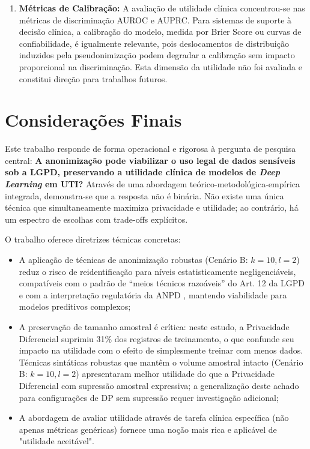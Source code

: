 \begin{enumerate}
    \item \textbf{Métricas de Calibração:} A avaliação de utilidade clínica concentrou-se nas métricas de discriminação AUROC e AUPRC. Para sistemas de suporte à decisão clínica, a calibração do modelo, medida por Brier Score ou curvas de confiabilidade, é igualmente relevante, pois deslocamentos de distribuição induzidos pela pseudonimização podem degradar a calibração sem impacto proporcional na discriminação. Esta dimensão da utilidade não foi avaliada e constitui direção para trabalhos futuros.
\end{enumerate}

\section{Considerações Finais}
\label{sec:conclusao-finais}

Este trabalho responde de forma operacional e rigorosa à pergunta de pesquisa central: \textbf{A anonimização pode viabilizar o uso legal de dados sensíveis sob a LGPD, preservando a utilidade clínica de modelos de \textit{Deep Learning} em UTI?} Através de uma abordagem teórico-metodológica-empírica integrada, demonstra-se que a resposta não é binária. Não existe uma única técnica que simultaneamente maximiza privacidade e utilidade; ao contrário, há um espectro de escolhas com trade-offs explícitos.

O trabalho oferece diretrizes técnicas concretas:

\begin{itemize}
    \item A aplicação de técnicas de anonimização robustas (Cenário B: $k=10, l=2$) reduz o risco de reidentificação para níveis estatisticamente negligenciáveis, compatíveis com o padrão de ``meios técnicos razoáveis'' do Art. 12 da LGPD \cite{Brasil2018lgpd} e com a interpretação regulatória da ANPD \cite{ANPD2023juridica}, mantendo viabilidade para modelos preditivos complexos;
    \item A preservação de tamanho amostral é crítica: neste estudo, a Privacidade Diferencial suprimiu 31\% dos registros de treinamento, o que confunde seu impacto na utilidade com o efeito de simplesmente treinar com menos dados. Técnicas sintáticas robustas que mantêm o volume amostral intacto (Cenário B: $k=10, l=2$) apresentaram melhor utilidade do que a Privacidade Diferencial com supressão amostral expressiva; a generalização deste achado para configurações de DP sem supressão requer investigação adicional;
    \item A abordagem de avaliar utilidade através de tarefa clínica específica (não apenas métricas genéricas) fornece uma noção mais rica e aplicável de "utilidade aceitável".
\end{itemize}

